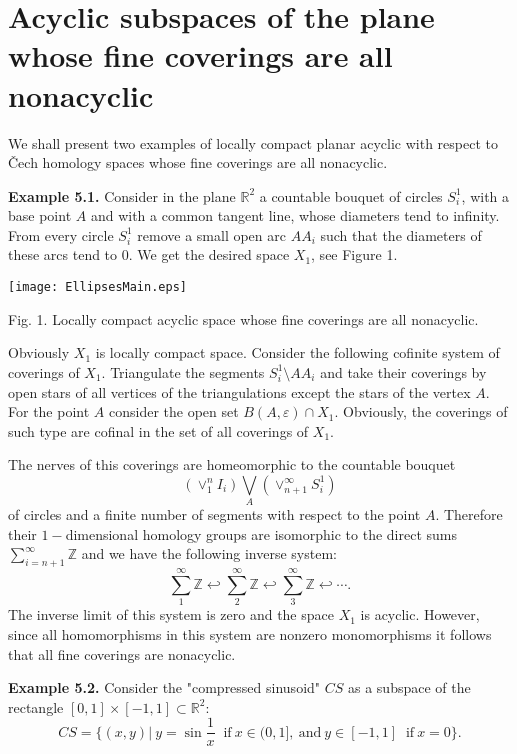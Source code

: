 \section{Acyclic subspaces of the plane whose
fine coverings are all nonacyclic}

We shall present two examples of locally compact planar acyclic 
with respect to {\v C}ech homology spaces whose fine coverings are all nonacyclic.
\medskip

{\bf Example 5.1.} Consider in the plane $\mathbb{R}^2$ a
countable bouquet of circles $S^1_i$,
with a base point $A$
and with a common tangent line,
whose diameters
 tend to infinity.
From every
circle $S^1_i$ remove a small open arc 
$AA_i$ such
that the diameters of these arcs tend to 0. We get the desired
space $X_1$, see Figure 1.

\begin{center} 
\texttt{[image: EllipsesMain.eps]}

\begin{center}\vspace{-3mm}\normalsize{Fig. 1. Locally compact acyclic
space whose fine coverings are all nonacyclic.}\end{center}
\end{center}

Obviously $X_1$ is locally compact space. Consider the following
cofinite  system of coverings of $X_1.$ Triangulate the segments
$S_{i}^1 \setminus  AA_{i}$ and take their coverings by
open stars of all vertices of the triangulations except the stars
of the vertex $A.$ For the point $A$ consider the open set $B(A,
\varepsilon)\cap X_1.$ Obviously, the coverings of such type are
cofinal in the set of all coverings of $X_1.$ 

The nerves of this
coverings are homeomorphic to the countable bouquet
$$(\vee_1^nI_i)\bigvee_A (\vee_{n+1}^{\infty}S_i^1)$$ of circles and
a finite number of segments with respect to the point $A.$
Therefore their $1-$dimensional homology groups are isomorphic to
the direct sums $\sum_{i=n+1}^{\infty}\mathbb{Z}$ and we have the
following inverse system:
$$\sum_{1}^{\infty}\mathbb{Z}\hookleftarrow
\sum_{2}^{\infty}\mathbb{Z}\hookleftarrow
\sum_{3}^{\infty}\mathbb{Z}\hookleftarrow \cdots .$$ The inverse
limit of this system is zero and the space $X_1$ is acyclic.
However, since all homomorphisms in this system are nonzero
monomorphisms it follows that all fine coverings are nonacyclic.

\medskip
{\bf Example 5.2.} Consider the "compressed sinusoid" $CS$ as a
subspace of the rectangle $[0, 1]\times [-1, 1] \subset
\mathbb{R}^2:$
$$CS = \{(x, y)|\ y = \sin {\frac{1}{x}}\ \mbox{ if}\ x\in (0, 1],\ \mbox
{and}\ y\in [-1,1]\ \mbox{ if}\ x = 0 \}.$$

